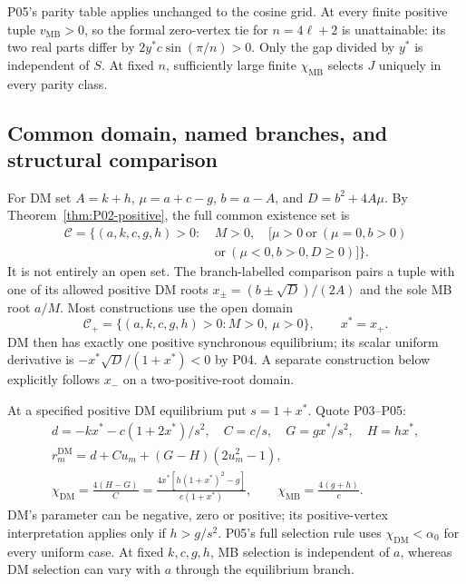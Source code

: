 \documentclass[11pt]{article}
\newcommand{\DM}{\mathrm{DM}}
\newcommand{\MB}{\mathrm{MB}}
\theoremstyle{definition}
\theoremstyle{remark}
\begin{document}
P05's parity table applies unchanged to the cosine grid. At every finite
positive tuple $v_{\MB}>0$, so the formal zero-vertex tie for
$n=4\ell+2$ is unattainable: its two real parts differ by
$2y^*c\sin(\pi/n)>0$. Only the gap divided by $y^*$ is independent
of $S$. At fixed $n$, sufficiently large finite $\chi_{\MB}$ selects
$J$ uniquely in every parity class.

\subsection{Common domain, named branches, and structural comparison}
\label{slot:P08-5}
For DM set $A=k+h$, $\mu=a+c-g$, $b=a-A$, and $D=b^2+4A\mu$.
By Theorem~\ref{thm:P02-positive}, the full common existence set is
\begin{equation}
\begin{split}
 \mathcal C=\{(a,k,c,g,h)>0:\ &M>0,\quad
 [\mu>0\ \text{or}\ (\mu=0,b>0)\\
 &\text{or}\ (\mu<0,b>0,D\ge0)]\}.
\end{split}\label{eq:P08-common}
\end{equation}
It is not entirely an open set. The branch-labelled comparison pairs
a tuple with one of its allowed positive DM roots
$x_\pm=(b\pm\sqrt D)/(2A)$ and the sole MB root $a/M$.
Most constructions use the open domain
\begin{equation}
 \mathcal C_+=\{(a,k,c,g,h)>0:M>0,\ \mu>0\},\qquad x^*=x_+.
 \label{eq:P08-common-simple}
\end{equation}
DM then has exactly one positive synchronous equilibrium; its scalar
uniform derivative is $-x^*\sqrt D/(1+x^*)<0$ by P04. A separate
construction below explicitly follows $x_-$ on a two-positive-root domain.

At a specified positive DM equilibrium put $s=1+x^*$. Quote P03--P05:
\begin{equation}
\begin{gathered}
 d=-kx^*-c(1+2x^*)/s^2,\quad C=c/s,\quad G=gx^*/s^2,\quad H=hx^*,\\
 r_m^{\DM}=d+Cu_m+(G-H)(2u_m^2-1),\\
 \chi_{\DM}=\frac{4(H-G)}C
 =\frac{4x^*[h(1+x^*)^2-g]}{c(1+x^*)},\qquad
 \chi_{\MB}=\frac{4(g+h)}c.
\end{gathered}\label{eq:P08-DM-input}
\end{equation}
DM's parameter can be negative, zero or positive; its positive-vertex
interpretation applies only if $h>g/s^2$. P05's full selection rule uses
$\chi_{\DM}<\alpha_0$ for every uniform case. At fixed $k,c,g,h$,
MB selection is independent of $a$, whereas DM selection can vary with
$a$ through the equilibrium branch.
\end{document}
